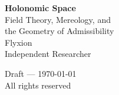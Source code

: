 
\begin{titlepage}
\centering
\vspace*{2cm}

{\Huge\bfseries Holonomic Space}\\[1em]
{\Large Field Theory, Mereology, and\\[0.3em]
the Geometry of Admissibility}\\[3em]

{\large Flyxion}\\[1em]
{\normalsize Independent Researcher}\\[4em]

\vfill

{\small Draft --- \today}\\[0.5em]
{\small All rights reserved}

\end{titlepage}
